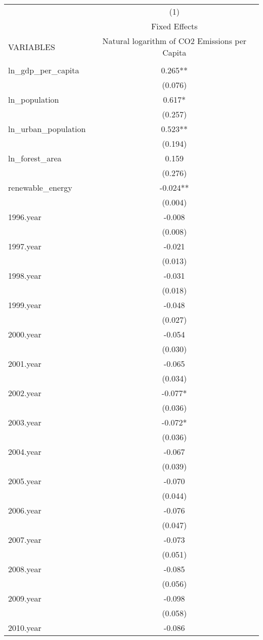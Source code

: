 \begin{tabular}{lc} \hline
 & (1) \\
 & Fixed Effects \\
VARIABLES & Natural logarithm of CO2 Emissions per Capita \\ \hline
 &  \\
ln\_gdp\_per\_capita & 0.265** \\
 & (0.076) \\
ln\_population & 0.617* \\
 & (0.257) \\
ln\_urban\_population & 0.523** \\
 & (0.194) \\
ln\_forest\_area & 0.159 \\
 & (0.276) \\
renewable\_energy & -0.024** \\
 & (0.004) \\
1996.year & -0.008 \\
 & (0.008) \\
1997.year & -0.021 \\
 & (0.013) \\
1998.year & -0.031 \\
 & (0.018) \\
1999.year & -0.048 \\
 & (0.027) \\
2000.year & -0.054 \\
 & (0.030) \\
2001.year & -0.065 \\
 & (0.034) \\
2002.year & -0.077* \\
 & (0.036) \\
2003.year & -0.072* \\
 & (0.036) \\
2004.year & -0.067 \\
 & (0.039) \\
2005.year & -0.070 \\
 & (0.044) \\
2006.year & -0.076 \\
 & (0.047) \\
2007.year & -0.073 \\
 & (0.051) \\
2008.year & -0.085 \\
 & (0.056) \\
2009.year & -0.098 \\
 & (0.058) \\
2010.year & -0.086 \\

\end{tabular}
